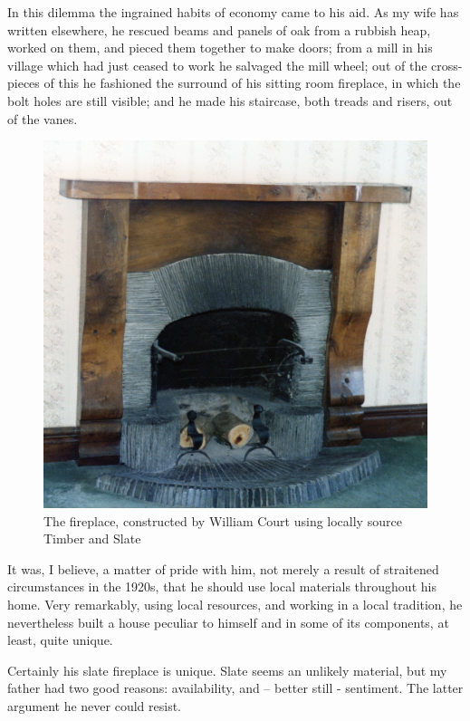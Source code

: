 In this dilemma the ingrained habits of economy came to his aid. As my wife has written elsewhere, he rescued beams and panels of oak from a rubbish heap, worked on them, and pieced them together to make doors; from a mill in his village which had just ceased to work he salvaged the mill wheel; out of the cross-pieces of this he fashioned the surround of his sitting room fireplace, in which the bolt holes are still visible; and he made his staircase, both treads and risers, out of the vanes.

\begin{figure}
	\centering
     \includegraphics[width=1\textwidth]{figures/Fireplace}
     \caption{The fireplace, constructed by William Court using locally source Timber and Slate}
     \label{fig:Fireplace}
\end{figure}

It was, I believe, a matter of pride with him, not merely a result of straitened circumstances in the 1920s, that he should use local materials throughout his home. Very remarkably, using local resources, and working in a local tradition, he nevertheless built a house peculiar to himself and in some of its components, at least, quite unique.

Certainly his slate fireplace is unique. Slate seems an unlikely material, but my father had two good reasons: availability, and – better still - sentiment. The latter argument he never could resist.

